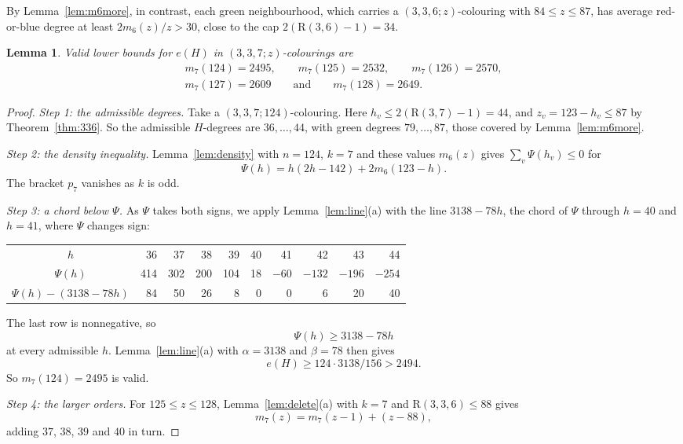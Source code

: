 \documentclass[11pt]{article}
\theoremstyle{spacedplain}
\newtheorem{lemma}[theorem]{Lemma}
\theoremstyle{spaceddef}
\theoremstyle{spacedremark}
\newcommand{\R}{\mathrm{R}}
\begin{document}
By Lemma~\ref{lem:m6more}, in contrast, each green neighbourhood, which carries a $(3,3,6;z)$-colouring with $84\le z\le 87$, has average red-or-blue degree at least $2m_6(z)/z>30$, close to the cap $2(\R(3,6)-1)=34$.

\begin{lemma}\label{lem:m7}
Valid lower bounds for $e(H)$ in $(3,3,7;z)$-colourings are
\begin{gather*}
m_7(124)=2495,\qquad m_7(125)=2532,\qquad m_7(126)=2570,\\
m_7(127)=2609\qquad\text{and}\qquad m_7(128)=2649.
\end{gather*}
\end{lemma}

\begin{proof}
\emph{Step 1: the admissible degrees.}
Take a $(3,3,7;124)$-colouring.
Here $h_v\le 2(\R(3,7)-1)=44$, and $z_v=123-h_v\le 87$ by Theorem~\ref{thm:336}.
So the admissible $H$-degrees are $36,\dots,44$, with green degrees $79,\dots,87$, those covered by Lemma~\ref{lem:m6more}.

\emph{Step 2: the density inequality.}
Lemma~\ref{lem:density} with $n=124$, $k=7$ and these values $m_6(z)$ gives $\sum_v\Psi(h_v)\le 0$ for
\[
\Psi(h)=h(2h-142)+2m_6(123-h).
\]
The bracket $p_7$ vanishes as $k$ is odd.

\emph{Step 3: a chord below $\Psi$.}
As $\Psi$ takes both signs, we apply Lemma~\ref{lem:line}(a) with the line $3138-78h$, the chord of $\Psi$ through $h=40$ and $h=41$, where $\Psi$ changes sign:
\begin{center}\small
\begin{tabular}{c*{9}{r}}
\toprule
$h$ &36&37&38&39&40&41&42&43&44\\
$\Psi(h)$ &414&302&200&104&18&$-60$&$-132$&$-196$&$-254$\\
$\Psi(h)-(3138-78h)$ &84&50&26&8&0&0&6&20&40\\
\bottomrule
\end{tabular}
\end{center}
The last row is nonnegative, so
\[
\Psi(h)\ge 3138-78h
\]
at every admissible $h$.
Lemma~\ref{lem:line}(a) with $\alpha=3138$ and $\beta=78$ then gives
\[
e(H)\ge 124\cdot 3138/156>2494.
\]
So $m_7(124)=2495$ is valid.

\emph{Step 4: the larger orders.}
For $125\le z\le 128$, Lemma~\ref{lem:delete}(a) with $k=7$ and $\R(3,3,6)\le 88$ gives
\[
m_7(z)=m_7(z-1)+(z-88),
\]
adding $37$, $38$, $39$ and $40$ in turn.
\end{proof}
\end{document}
